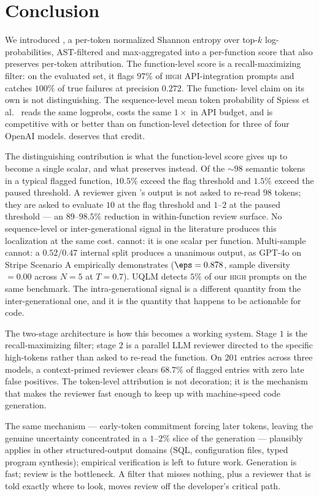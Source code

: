 \section{Conclusion}
\label{sec:conclusion}

We introduced \eps, a per-token normalized Shannon entropy over
top-$k$ log-probabilities, AST-filtered and max-aggregated into a
per-function score that also preserves per-token attribution. The
function-level score is a recall-maximizing filter: on the evaluated
set, it flags $97\%$ of \textsc{high} API-integration prompts and
catches $100\%$ of true failures at precision $0.272$. The function-%
level claim on its own is not distinguishing. The sequence-level
mean token probability \papg of Spiess et
al.~\cite{spiess2025calibration} reads the same logprobs, costs the
same $1\times$ in API budget, and is competitive with or better
than \eps on function-level detection for three of four OpenAI
models. \papg deserves that credit.

The distinguishing contribution is what the function-level score
gives up to become a single scalar, and what \eps preserves instead.
Of the $\sim 98$ semantic tokens in a typical flagged function,
$10.5\%$ exceed the flag threshold and $1.5\%$ exceed the paused
threshold. A reviewer given \eps's output is not asked to re-read
$98$ tokens; they are asked to evaluate $10$ at the flag threshold
and $1$--$2$ at the paused threshold --- an $89$--$98.5\%$
reduction in within-function review surface. No sequence-level or
inter-generational signal in the literature produces this
localization at the same cost. \papg cannot: it is one scalar per
function. Multi-sample cannot: a $0.52/0.47$ internal split
produces a unanimous output, as GPT-4o on Stripe Scenario A
empirically demonstrates ($\eps = 0.878$, sample diversity $=0.00$
across $N=5$ at $T=0.7$). UQLM detects $5\%$ of our \textsc{high}
prompts on the same benchmark. The intra-generational signal is a
different quantity from the inter-generational one, and it is the
quantity that happens to be actionable for code.

The two-stage architecture is how this becomes a working system.
Stage $1$ is the recall-maximizing filter; stage $2$ is a parallel
LLM reviewer directed to the specific high-\eps tokens rather than
asked to re-read the function. On $201$ entries across three
models, a context-primed reviewer clears $68.7\%$ of flagged entries
with zero late false positives. The token-level attribution is not
decoration; it is the mechanism that makes the reviewer fast enough
to keep up with machine-speed code generation.

The same mechanism --- early-token commitment forcing later tokens,
leaving the genuine uncertainty concentrated in a $1$--$2\%$ slice
of the generation --- plausibly applies in other structured-output
domains (SQL, configuration files, typed program synthesis);
empirical verification is left to future work. Generation is fast;
review is the bottleneck. A filter that misses nothing, plus a
reviewer that is told exactly where to look, moves review off the
developer's critical path.
